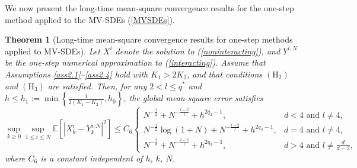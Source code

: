 \documentclass[12pt]{article}
\numberwithin{equation}{section}
\newtheorem{theorem}[assumption]{Theorem}   %
\begin{document}
We now present the long-time mean-square convergence
results for the one-step method applied to the MV-SDEs (\ref{MVSDEs}).
\begin{theorem}[Long-time mean-square convergence results for one-step methods applied to MV-SDEs]\label{theorem 4.3}
Let $X^{i}$ denote the solution to (\ref{noninteracting}), and $Y^{i,N}$ be the one-step numerical approximation to (\ref{interacting}). Assume that Assumptions \ref{ass2.1}--\ref{ass2.4} hold with $K_1>2 K_2$, and that conditions $\left(\mathrm{H}_2\right)$ and $\left(\mathrm{H}_3\right)$ are satisfied. Then, for any $2<l\leq q^*$ and $h \leq h_1:=\min \left\{\tfrac{1}{2\left(K_1-K_2\right)}, h_0\right\}$, the global mean-square error satisfies
\begin{equation}\tag{3.14}\label{4.40}
\underset{k\geqslant0}{\sup}\underset{1\leqslant i\leqslant N}{\sup}\mathbb{E}\left[\left|X_k^i-Y_k^{i, N}\right|^2\right] 
\leq C_6 \begin{cases}N^{-\frac{1}{2}}+N^{-\frac{{l}-2}{l}}+h^{2q_2-1}, & d<4 \text { and } {l} \neq 4, \\ N^{-\frac{1}{2}} \log \left(1+N\right)+N^{-\frac{{l}-2}{{l}}}+h^{2q_2-1}, & d=4 \text { and } {l} \neq 4, \\ N^{-\frac{2}{d}}+N^{-\frac{{l}-2}{l}}+h^{2q_2-1}, & d>4 \text { and } {l} \neq \frac{d}{d-2} ,\end{cases}
\end{equation}
where $C_6$ is a constant independent of $h$, $k$, $N$.
\end{theorem}
\end{document}
